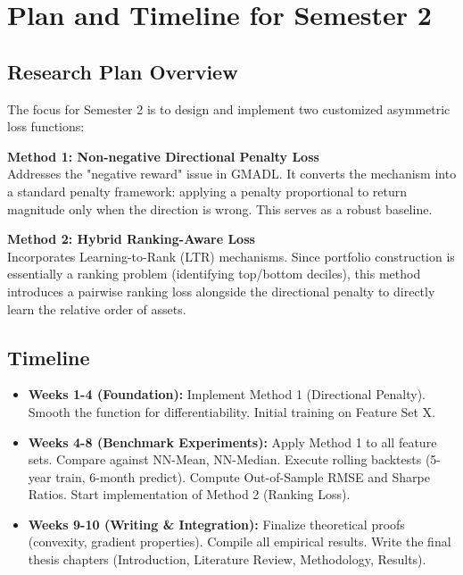 \documentclass[openany]{book}
\numberwithin{figure}{chapter}
\numberwithin{equation}{chapter}
\begin{document}
\chapter{Plan and Timeline for Semester 2}

\section{Research Plan Overview}
The focus for Semester 2 is to design and implement two customized asymmetric loss functions:

\textbf{Method 1: Non-negative Directional Penalty Loss} \\
Addresses the "negative reward" issue in GMADL. It converts the mechanism into a standard penalty framework: applying a penalty proportional to return magnitude only when the direction is wrong. This serves as a robust baseline.

\textbf{Method 2: Hybrid Ranking-Aware Loss} \\
Incorporates Learning-to-Rank (LTR) mechanisms. Since portfolio construction is essentially a ranking problem (identifying top/bottom deciles), this method introduces a pairwise ranking loss alongside the directional penalty to directly learn the relative order of assets.

\section{Timeline}
\begin{itemize}
    \item \textbf{Weeks 1-4 (Foundation):} Implement Method 1 (Directional Penalty). Smooth the function for differentiability. Initial training on Feature Set X.
    \item \textbf{Weeks 4-8 (Benchmark Experiments):} Apply Method 1 to all feature sets. Compare against NN-Mean, NN-Median. Execute rolling backtests (5-year train, 6-month predict). Compute Out-of-Sample RMSE and Sharpe Ratios. Start implementation of Method 2 (Ranking Loss).
    \item \textbf{Weeks 9-10 (Writing \& Integration):} Finalize theoretical proofs (convexity, gradient properties). Compile all empirical results. Write the final thesis chapters (Introduction, Literature Review, Methodology, Results).
\end{itemize}

\cleardoublepage
\end{document}
